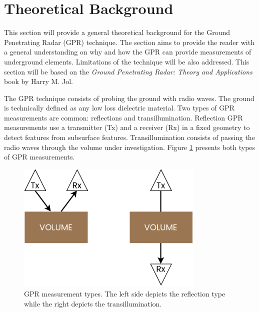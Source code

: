 \documentclass{article}
\begin{document}
\section{Theoretical Background}
This section will provide a general theoretical background for the Ground Penetrating Radar (GPR) technique. The section aims to provide the reader with a general understanding on why and how the GPR can provide measurements of underground elements. Limitations of the technique will be also addressed. This section will be based on the \textit{Ground Penetrating Radar: Theory and Applications} book by Harry M. Jol.

The GPR technique consists of probing the ground with radio waves. The ground is technically defined as any low loss dielectric material. Two types of GPR measurements are common: reflections and transillumination. Reflection GPR measurements use a transmitter (Tx) and a receiver (Rx) in a fixed geometry to detect features from subsurface features. Transillumination consists of passing the radio waves through the volume under investigation. Figure \ref{fig:surveying} presents both types of GPR measurements.

\begin{figure}[h]
    \centering
    \includegraphics[width=0.8\textwidth]{images/theoretical/GPR20_surveying.pdf}
    \caption{GPR measurement types. The left side depicts the reflection type while the right depicts the transillumination.}
    \label{fig:surveying}
\end{figure}
\end{document}
